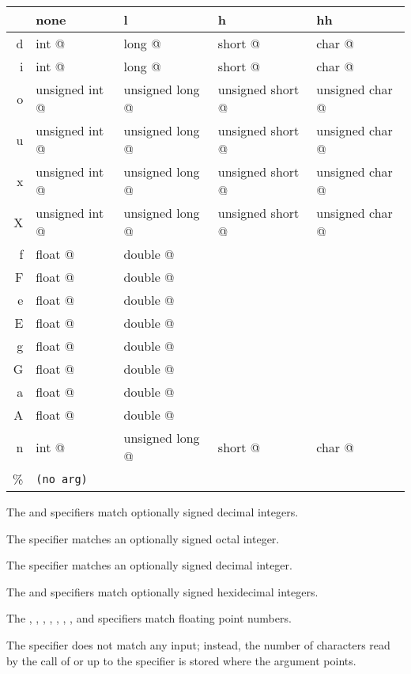 \begin{tt}
\begin{tabular}{r|llll}
  & none           & l               & h                &  hh\\\hline
d & int @          & long @          & short @          & char @ \\
i & int @          & long @          & short @          & char @ \\
o & unsigned int @ & unsigned long @ & unsigned short @ & unsigned char @ \\
u & unsigned int @ & unsigned long @ & unsigned short @ & unsigned char @ \\
x & unsigned int @ & unsigned long @ & unsigned short @ & unsigned char @ \\
X & unsigned int @ & unsigned long @ & unsigned short @ & unsigned char @ \\
f & float @        & double @ \\
F & float @        & double @ \\
e & float @        & double @ \\
E & float @        & double @ \\
g & float @        & double @ \\
G & float @        & double @ \\
a & float @        & double @ \\
A & float @        & double @ \\
n & int @          & unsigned long @ & short @          & char @ \\
\% & \texttt{(no arg)}
\end{tabular}
\end{tt}

The  and  specifiers match optionally signed decimal
integers.

The  specifier matches an optionally signed octal integer.

The  specifier matches an optionally signed decimal integer.

The  and  specifiers match optionally signed hexidecimal
integers.

The , , , , , ,
, and  specifiers match floating point numbers.

The  specifier does not match any input; instead, the number of
characters read by the call of  or  up to the
 specifier is stored where the argument points.

